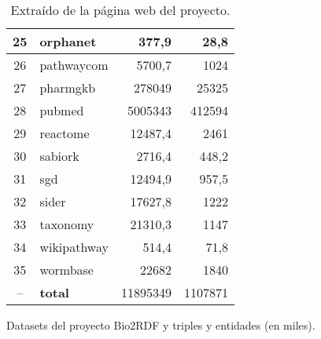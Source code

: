 \begin{table}[htpb]
\begin{tabular}{|c|l|r|r|}
  25 & orphanet    &    377,9 &    28,8\\\hline
  26 & pathwaycom  &   5700,7 &    1024\\\hline
  27 & pharmgkb    &   278049 &   25325\\\hline
  28 & pubmed      &  5005343 &  412594\\\hline
  29 & reactome    &  12487,4 &    2461\\\hline
  30 & sabiork     &   2716,4 &   448,2\\\hline
  31 & sgd         &  12494,9 &   957,5\\\hline
  32 & sider       &  17627,8 &    1222\\\hline
  33 & taxonomy    &  21310,3 &    1147\\\hline
  34 & wikipathway &    514,4 &    71,8\\\hline
  35 & wormbase    &    22682 &    1840\\\hline
  -- & \bf{total}  & 11895349 & 1107871\\\hline
\end{tabular}
\caption{Datasets del proyecto Bio2RDF y triples y entidades (en miles).}
\vspace{-.3cm}
\caption*{Extraído de la página web del proyecto.}
\label{tab:bio2RDFdataset}
\end{table}
